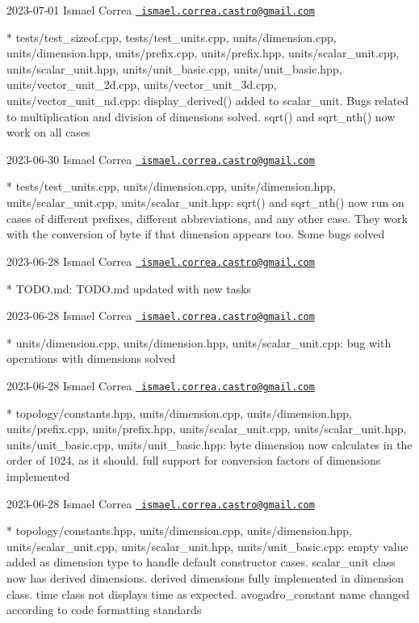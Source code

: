  2023-\/07-\/01 Ismael Correa \href{mailto:ismael.correa.castro@gmail.com}{\texttt{ ismael.\+correa.\+castro@gmail.\+com}} \begin{DoxyVerb}* tests/test_sizeof.cpp, tests/test_units.cpp, units/dimension.cpp,
units/dimension.hpp, units/prefix.cpp, units/prefix.hpp,
units/scalar_unit.cpp, units/scalar_unit.hpp, units/unit_basic.cpp,
units/unit_basic.hpp, units/vector_unit_2d.cpp,
units/vector_unit_3d.cpp, units/vector_unit_nd.cpp: 
display_derived() added to scalar_unit. Bugs related to
multiplication and division of dimensions solved. sqrt() and
sqrt_nth() now work on all cases
\end{DoxyVerb}
 2023-\/06-\/30 Ismael Correa \href{mailto:ismael.correa.castro@gmail.com}{\texttt{ ismael.\+correa.\+castro@gmail.\+com}} \begin{DoxyVerb}* tests/test_units.cpp, units/dimension.cpp, units/dimension.hpp,
units/scalar_unit.cpp, units/scalar_unit.hpp: sqrt() and sqrt_nth()
now run on cases of different prefixes, different abbreviations, and
any other case. They work with the conversion of byte if that
dimension appears too. Some bugs solved
\end{DoxyVerb}
 2023-\/06-\/28 Ismael Correa \href{mailto:ismael.correa.castro@gmail.com}{\texttt{ ismael.\+correa.\+castro@gmail.\+com}} \begin{DoxyVerb}* TODO.md: TODO.md updated with new tasks
\end{DoxyVerb}
 2023-\/06-\/28 Ismael Correa \href{mailto:ismael.correa.castro@gmail.com}{\texttt{ ismael.\+correa.\+castro@gmail.\+com}} \begin{DoxyVerb}* units/dimension.cpp, units/dimension.hpp, units/scalar_unit.cpp: 
bug with operations with dimensions solved
\end{DoxyVerb}
 2023-\/06-\/28 Ismael Correa \href{mailto:ismael.correa.castro@gmail.com}{\texttt{ ismael.\+correa.\+castro@gmail.\+com}} \begin{DoxyVerb}* topology/constants.hpp, units/dimension.cpp, units/dimension.hpp,
units/prefix.cpp, units/prefix.hpp, units/scalar_unit.cpp,
units/scalar_unit.hpp, units/unit_basic.cpp, units/unit_basic.hpp: 
byte dimension now calculates in the order of 1024, as it should.
full support for conversion factors of dimensions implemented
\end{DoxyVerb}
 2023-\/06-\/28 Ismael Correa \href{mailto:ismael.correa.castro@gmail.com}{\texttt{ ismael.\+correa.\+castro@gmail.\+com}} \begin{DoxyVerb}* topology/constants.hpp, units/dimension.cpp, units/dimension.hpp,
units/scalar_unit.cpp, units/scalar_unit.hpp, units/unit_basic.cpp: 
empty value added as dimension type to handle default constructor
cases. scalar_unit class now has derived dimensions. derived
dimensions fully implemented in dimension class. time class not
displays time as expected. avogadro_constant name changed according
to code formatting standards
\end{DoxyVerb}
